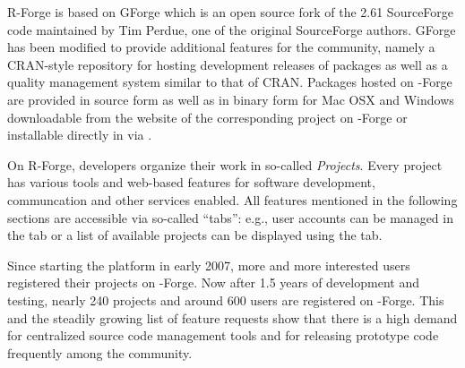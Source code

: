 R-Forge is based on GForge \citep{forge:copeland_et_al:2006} which is
an open source fork of the 2.61 SourceForge code maintained by Tim
Perdue, one of the original SourceForge authors. GForge has been
modified to provide additional features for the \R{} community, namely
a CRAN-style repository for hosting development releases of \R{}
packages as well as a quality management system similar to that of
CRAN.
Packages hosted on \R{}-Forge are provided in source form as well as
in binary form for Mac OSX and Windows downloadable from the website
of the corresponding project on \R{}-Forge or installable directly in
\R{} via .






On R-Forge, developers organize their work
in so-called \textit{Projects}. Every project has various tools and
web-based features for software development, communcation and other
services enabled. All features mentioned in the 
following sections are accessible via so-called 
``tabs'': e.g., user accounts can be managed in the  tab or
a list of available projects can be displayed using the
 tab.

Since starting the platform in early 2007, more
and more interested users registered their projects on \R{}-Forge. Now
after 1.5 years of development and testing, nearly
240 projects and around 600  
users are registered on \R{}-Forge. This and the steadily growing list of
feature requests show that there is a high demand for centralized source code
management tools and for releasing prototype code frequently among the
\R{} community.

